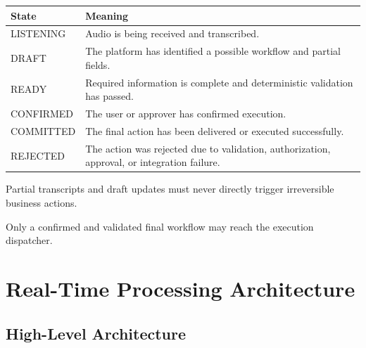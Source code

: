 \documentclass[11pt,a4paper]{article}
\begin{document}
\begin{tabularx}{\textwidth}{L{30mm}Y}
\toprule
\textbf{State} & \textbf{Meaning} \\
\midrule
LISTENING
& Audio is being received and transcribed. \\

DRAFT
& The platform has identified a possible workflow and partial fields. \\

READY
& Required information is complete and deterministic validation has passed. \\

CONFIRMED
& The user or approver has confirmed execution. \\

COMMITTED
& The final action has been delivered or executed successfully. \\

REJECTED
& The action was rejected due to validation, authorization, approval, or integration failure. \\
\bottomrule
\end{tabularx}

\begin{warningbox}
Partial transcripts and draft updates must never directly trigger
irreversible business actions.

Only a confirmed and validated final workflow may reach the execution
dispatcher.
\end{warningbox}

\section{Real-Time Processing Architecture}

\subsection{High-Level Architecture}
\end{document}
